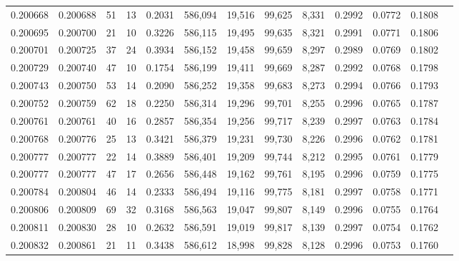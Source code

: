 \begin{tabular}{rrrrrrrrrrrrr}
0.200668 & 0.200688 &    51 &  13 &                                     0.2031 & 586,094 &  19,516 &  99,625 &   8,331 & 0.2992 & 0.0772 & 0.1808 \\
0.200695 & 0.200700 &    21 &  10 &                                     0.3226 & 586,115 &  19,495 &  99,635 &   8,321 & 0.2991 & 0.0771 & 0.1806 \\
0.200701 & 0.200725 &    37 &  24 &                                     0.3934 & 586,152 &  19,458 &  99,659 &   8,297 & 0.2989 & 0.0769 & 0.1802 \\
0.200729 & 0.200740 &    47 &  10 &                                     0.1754 & 586,199 &  19,411 &  99,669 &   8,287 & 0.2992 & 0.0768 & 0.1798 \\
0.200743 & 0.200750 &    53 &  14 &                                     0.2090 & 586,252 &  19,358 &  99,683 &   8,273 & 0.2994 & 0.0766 & 0.1793 \\
0.200752 & 0.200759 &    62 &  18 &                                     0.2250 & 586,314 &  19,296 &  99,701 &   8,255 & 0.2996 & 0.0765 & 0.1787 \\
0.200761 & 0.200761 &    40 &  16 &                                     0.2857 & 586,354 &  19,256 &  99,717 &   8,239 & 0.2997 & 0.0763 & 0.1784 \\
0.200768 & 0.200776 &    25 &  13 &                                     0.3421 & 586,379 &  19,231 &  99,730 &   8,226 & 0.2996 & 0.0762 & 0.1781 \\
0.200777 & 0.200777 &    22 &  14 &                                     0.3889 & 586,401 &  19,209 &  99,744 &   8,212 & 0.2995 & 0.0761 & 0.1779 \\
0.200777 & 0.200777 &    47 &  17 &                                     0.2656 & 586,448 &  19,162 &  99,761 &   8,195 & 0.2996 & 0.0759 & 0.1775 \\
0.200784 & 0.200804 &    46 &  14 &                                     0.2333 & 586,494 &  19,116 &  99,775 &   8,181 & 0.2997 & 0.0758 & 0.1771 \\
0.200806 & 0.200809 &    69 &  32 &                                     0.3168 & 586,563 &  19,047 &  99,807 &   8,149 & 0.2996 & 0.0755 & 0.1764 \\
0.200811 & 0.200830 &    28 &  10 &                                     0.2632 & 586,591 &  19,019 &  99,817 &   8,139 & 0.2997 & 0.0754 & 0.1762 \\
0.200832 & 0.200861 &    21 &  11 &                                     0.3438 & 586,612 &  18,998 &  99,828 &   8,128 & 0.2996 & 0.0753 & 0.1760 \\

\end{tabular}
